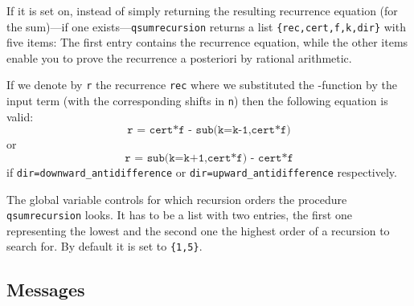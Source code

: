 \begin{itemize}
		If it is set on, instead of simply returning the 
		resulting recurrence equation (for the sum)---if one 
		exists---\texttt{qsumrecursion} returns 
		a list \texttt{\{rec,cert,f,k,dir\}} with
		five items: The first entry contains the
		recurrence equation, while the other items enable you to
		prove the recurrence a posteriori by rational arithmetic.

		If we denote by \texttt{r} the recurrence
		\texttt{rec} where we substituted the \verb@summ@-function
		by the input term \verb@f@ (with the corresponding shifts
		in \texttt{n}) then the following equation is valid:
		\[  \texttt{r = cert*f - sub(k=k-1,cert*f)}  \]
		or
		\[  \texttt{r = sub(k=k+1,cert*f) - cert*f}  \]
		if \texttt{dir=downward\_antidifference} or
		\texttt{dir=upward\_antidifference} respectively.
\end{itemize}

The global variable  controls for
which recursion orders the procedure \texttt{qsumrecursion} looks.
It has to be a list with two entries, the first one representing
the lowest and the second one the highest order of a recursion
to search for. By default it is set to \texttt{\{1,5\}}.


\subsection{Messages}

